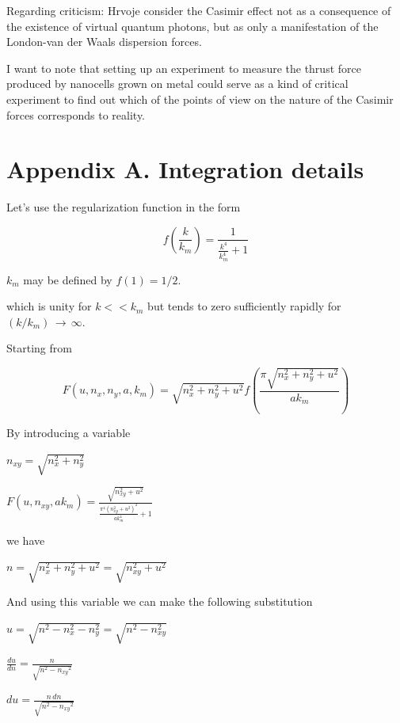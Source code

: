 \documentclass[11pt]{article}
\begin{document}
Regarding criticism: Hrvoje \cite{Hrvoje2016} consider the Casimir
effect not as a consequence of the existence of virtual quantum photons,
but as only a manifestation of the London-van der Waals dispersion
forces.

I want to note that setting up an experiment to measure the thrust force
produced by nanocells grown on metal could serve as a kind of critical
experiment to find out which of the points of view on the nature of the
Casimir forces corresponds to reality.

    \section{Appendix A. Integration
details}\label{appendix-a.-integration-details}

    Let's use the regularization function in the form

    \[f\left(\frac{k}{k_m}\right) = \frac{1}{\frac{k^{4}}{k_{m}^{4}} + 1}\]

    \(k_m\) may be defined by \(f(1) = 1/2\).

    which is unity for \(k << k_m\) but tends to zero sufficiently rapidly
for \((k/k_m)\, \rightarrow\,\infty\).

    Starting from

    \[F\left(u, n_x, n_y, a, k_m\right) = \sqrt{n_{x}^{2} + n_{y}^{2} + u^{2}} f\left(\frac{\pi \sqrt{n_{x}^{2} + n_{y}^{2} + u^{2}}}{a k_{m}}\right)\]


    By introducing a variable

\(n_{xy} = \sqrt{n_x^2 + n_y^2}\)

    \(F\left(u, n_{xy}, ak_m\right) = \frac{\sqrt{n_{\mathit{xy}}^{2} + u^{2}}}{\frac{\pi^{4} {\left(n_{\mathit{xy}}^{2} + u^{2}\right)}^{2}}{\mathit{ak}_{m}^{4}} + 1}\)

    we have

\(n = \sqrt{n_x^2 + n_y^2 + u^2} = \sqrt{n_{xy}^2 + u^2}\)

And using this variable we can make the following substitution

\(u = \sqrt{n^2 - n_x^2 - n_y^2} = \sqrt{n^2 - n_{xy}^2}\)

\(\frac{du}{dn} = \frac{n}{\sqrt{n^{2} - \mathit{n_{xy}}^{2}}}\)

\(d{u}= \frac{n\,d{n}}{\sqrt{n^{2} - \mathit{n_{xy}}^{2}}}\)
\end{document}
